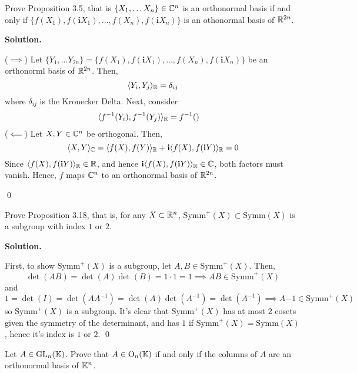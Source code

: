 \documentclass[12pt]{book}
\theoremstyle{definition}
\newenvironment{solution}
{%
  \par\noindent\textbf{Solution.}\quad
}
{%
  \qed\par
}
\begin{document}
\begin{taggedexercise}[\textcolor{yellow}{WIP}]
  Prove Proposition 3.5, that is $\{X_1, \dots X_n\} \in \mathbb{C}^n$ is an orthonormal basis if and only if $\{f(X_1), f(\mathbf{i}X_1), \dots ,f(X_n), f(\mathbf{i}X_n)\}$ is an othonormal basis of $\mathbb{R}^{2n}$. 
\end{taggedexercise}

\begin{solution}
  ($\implies$) Let $\{Y_1, \dots Y_{2n}\} = \{f(X_1), f(\mathbf{i}X_1), \dots ,f(X_n), f(\mathbf{i}X_n)\}$ be an orthonorml basis of $\mathbb{R}^{2n}$.
  Then,
  \[
  \langle Y_i, Y_j \rangle_{\mathbb{R}} = \delta_{ij}
  \]
  where $\delta_{ij}$ is the Kronecker Delta.
  Next, consider
  \[
  \begin{aligned}
    \langle f^{-1}(Y_i), f^{-1}(Y_j) \rangle_{\mathbb{R}} &= f^{-1}()
  \end{aligned}
  \]
  ($\impliedby$) Let $X, Y \in \mathbb{C}^n$ be orthogonal.
  Then,
  \[
  \langle X, Y \rangle_{\mathbb{C}} = \langle f(X), f(Y) \rangle_{\mathbb{R}} + \mathbf{i} \langle f(X), f(\mathbf{i}Y) \rangle_{\mathbb{R}} = 0
  \]
  Since $\langle f(X), f(\mathbf{i}Y) \rangle_{\mathbb{R}} \in \mathbb{R}$, and hence $\mathbf{i}\langle f(X), f(\mathbf{i}Y) \rangle_{\mathbb{R}} \in \mathbb{C}$, both factors must vanish.
  Hence, $f$ maps $\mathbb{C}^n$ to an orthonormal basis of $\mathbb{R}^{2n}$.

\end{solution}


\begin{taggedexercise}[\textcolor{green}{Complete}]
  Prove Proposition 3.18, that is, for any $X \subset \mathbb{R}^n$, $\text{Symm}^+(X) \subset \text{Symm}(X)$ is a subgroup with index $1$ or $2$.
\end{taggedexercise}

\begin{solution}
  First, to show $\text{Symm}^+(X)$ is a subgroup, let $A, B \in \text{Symm}^+(X)$. 
  Then,
  \[
  \det(AB) = \det(A)\det(B) = 1 \cdot 1 = 1 \implies AB \in \text{Symm}^+(X)
  \]
  and
  \[
  1 = \det(I) = \det(AA^{-1}) = \det(A)\det(A^{-1}) = \det(A^{-1}) \implies A{-1} \in \text{Symm}^+(X)
  \]
  so $\text{Symm}^+(X)$ is a subgroup. 
  It's clear that $\text{Symm}^+(X)$ has at most $2$ cosets given the symmetry of the determinant, and has $1$ if $\text{Symm}^+(X) = \text{Symm}(X)$, hence it's index is $1$ or $2$.
\end{solution}

\begin{taggedexercise}[\textcolor{green}{Complete}]
  Let $A \in \mathrm{GL}_{n}(\mathbb{K})$. Prove that $A \in \text{O}_n(\mathbb{K})$ if and only if the columns of $A$ are an orthonormal basis of $\mathbb{K}^n$.
\end{taggedexercise}
\end{document}
